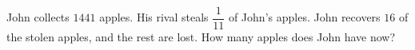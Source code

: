 John collects $1441$ apples. His rival steals $\dfrac{1}{11}$ of John's apples. John recovers $16$ of the stolen apples, and the rest are lost. How many apples does John have now?
